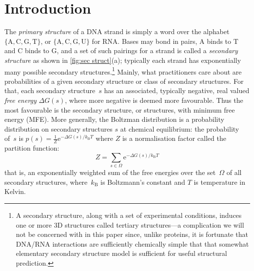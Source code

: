 \documentclass[11pt,letterpaper]{article}  \usepackage[margin=1in]{geometry}
\theoremstyle{definition}  \newtheorem{Definition}[theorem]{Definition}
\begin{document}
\newcommand{\base}[1]{\ensuremath{\mathrm{#1}}\xspace}
\newcommand{\baseA}{\base{A}}
\newcommand{\baseT}{\base{T}}
\newcommand{\baseG}{\base{G}}
\newcommand{\baseC}{\base{C}}
\newcommand{\baseU}{\base{U}}

\section{Introduction}

The  {\em primary structure} of a DNA strand is simply a word   over the alphabet  $\{\baseA, \baseC, \baseG, \baseT\}$, or  $\{\baseA, \baseC, \baseG, \baseU\}$ for RNA.  
Bases may bond in pairs, \baseA binds to \baseT and \baseC binds to \baseG, and a set of such pairings for a strand is called a {\em secondary structure} as shown in {\cref{fig:sec struct}(a)}; typically each strand has exponentially many possible secondary structures.\footnote{A secondary structure, along with a set of experimental conditions,  induces one or more 3D structures called tertiary structures---a complication we will not be concerned with in this paper since, unlike proteins, it is fortunate that DNA/RNA interactions are sufficiently chemically simple that that somewhat elementary secondary structure model is sufficient for useful structural prediction.} 
Mainly, what practitioners care about are probabilities of a given secondary structure or class of secondary structures. 
For that, each secondary structure~$s$ has an associated, typically negative, real valued {\em free energy} $\Delta G(s)$, where more negative is deemed more favourable.  
Thus the most favourable is the secondary structure, or structures, with minimum free energy (MFE). 
More generally, the Boltzman distribution is  a probability distribution on secondary structures $s$ at chemical equilibrium:  
the probability of~$s$ is  $p(s) = \frac{1}{Z} \mathrm{e}^{- \Delta G(s)/k_\mathrm{B}T}  $ where $Z$ is a normalisation factor called the partition function: 
\begin{equation}\label{eq:pf}
	Z  = \sum_{s\in\Omega} \mathrm{e}^{- \Delta G(s)/k_\mathrm{B}T} 
\end{equation}
that is, an exponentially weighted sum of the free energies over the set~$\Omega$ of all secondary structures, 
where~$k_\mathrm{B}$ is Boltzmann's constant and $T$ is temperature in Kelvin. 
\end{document}
